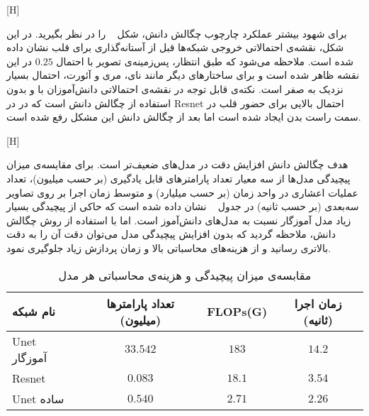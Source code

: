 [H]

برای شهود بیشتر عملکرد چارچوب چگالش دانش، شکل ~ را در نظر بگیرید. در این شکل، نقشه‌ی احتمالاتی خروجی شبکه‌ها قبل از آستانه‌گذاری برای قلب نشان داده شده است. ملاحظه می‌شود که طبق انتظار، پس‌زمینه‌ی تصویر با احتمال $0.25$ در این نقشه ظاهر شده است و برای ساختارهای دیگر مانند نای، مری و آئورت، احتمال بسیار نزدیک به صفر است. نکته‌ی قابل توجه در نقشه‌ی احتمالاتی دانش‌آموزان با و بدون استفاده از چگالش دانش است که در در Resnet احتمال بالایی برای حضور قلب در سمت راست بدن ایجاد شده است اما بعد از چگالش دانش این مشکل رفع شده است.

[H]

هدف چگالش دانش افزایش دقت در مدل‌های ضعیف‌تر است. برای مقایسه‌ی میزان پیچیدگی مدل‌ها از سه معیار تعداد پارامترهای قابل یادگیری (بر حسب میلیون)، تعداد عملیات اعشاری در واحد زمان (بر حسب میلیارد) و متوسط زمان اجرا بر روی تصاویر سه‌بعدی (بر حسب ثانیه) در جدول ~ نشان داده شده است که حاکی از پیچیدگی بسیار زیاد مدل آموزگار نسبت به مدل‌های دانش‌آموز است. اما با استفاده از روش چگالش دانش، ملاحظه گردید که بدون افزایش پیچیدگی مدل می‌توان دقت آن را به دقت بالاتری رسانید و از هزینه‌های محاسباتی بالا و زمان پردازش زیاد جلوگیری نمود.


\begin{table}[H]
	\caption{مقابسه‌ی میزان پیچیدگی و هزینه‌ی محاسباتی هر مدل}
	\label{modelscomplexity}
	\centering
	\begin{tabular}{lccc}
		\toprule
		نام شبکه & تعداد پارامترها (میلیون) & FLOPs(G) &زمان اجرا (ثانیه) \\
		\midrule
		Unet آموزگار & $33.542$ & $183$ & $14.2$ \\
		Resnet & $0.083$ & $18.1$ & $3.54$ \\
		Unet ساده & $0.540$ & $2.71$ & $2.26$ \\
		
		\bottomrule
	\end{tabular}
\end{table}


